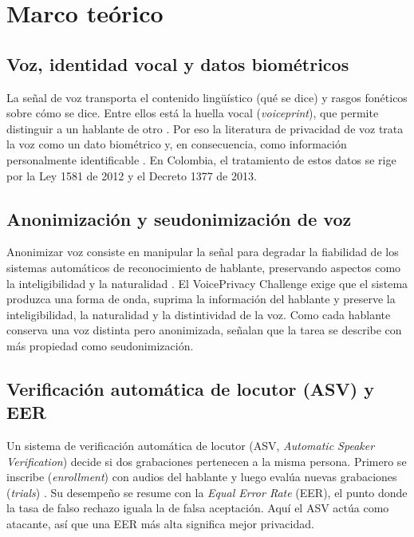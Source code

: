 \section{Marco teórico}

\subsection{Voz, identidad vocal y datos biométricos}
La señal de voz transporta el contenido lingüístico (qué se dice) 
y rasgos fonéticos sobre cómo se dice. Entre ellos está la huella 
vocal (\textit{voiceprint}), que permite distinguir a un hablante 
de otro \parencite{deng2023}. Por eso la literatura de privacidad 
de voz trata la voz como un dato biométrico y, en consecuencia, 
como información personalmente identificable \parencite{patino2021}. 
En Colombia, el tratamiento de estos datos se rige por la Ley 1581 
de 2012 y el Decreto 1377 de 2013. 

\subsection{Anonimización y seudonimización de voz}
Anonimizar voz consiste en manipular la señal para degradar 
la fiabilidad de los sistemas automáticos de reconocimiento 
de hablante, preservando aspectos como la inteligibilidad y 
la naturalidad \parencite{patino2021}. El VoicePrivacy Challenge 
exige que el sistema produzca una forma de onda, suprima la 
información del hablante y preserve la inteligibilidad, la naturalidad 
y la distintividad de la voz. Como cada hablante conserva una 
voz distinta pero anonimizada, \textcite{patino2021} señalan que 
la tarea se describe con más propiedad como seudonimización. 


\subsection{Verificación automática de locutor (ASV) y EER}
Un sistema de verificación automática de locutor (ASV, \textit{Automatic Speaker Verification}) 
decide si dos grabaciones pertenecen a la misma persona. Primero se inscribe (\textit{enrollment}) 
con audios del hablante y luego evalúa nuevas grabaciones (\textit{trials}) \parencite{deng2023}. 
Su desempeño se resume con la \textit{Equal Error Rate} (EER), el punto donde la tasa de falso 
rechazo iguala la de falsa aceptación. Aquí el ASV actúa como atacante, así que una EER más alta 
significa mejor privacidad.

